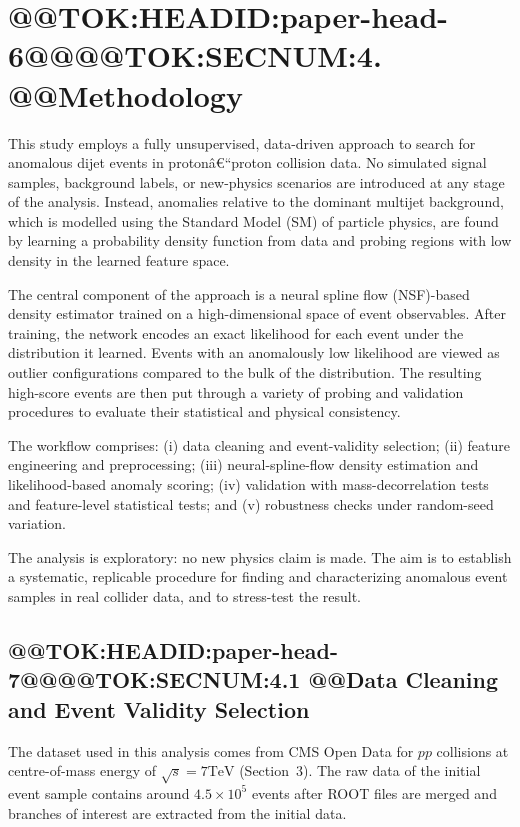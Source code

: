 \documentclass[11pt]{article}
\begin{document}
\section{@@TOK:HEADID:paper-head-6@@@@TOK:SECNUM:4. @@Methodology}

This study employs a fully unsupervised, data-driven approach to search for anomalous dijet events in protonâ€“proton collision data. No simulated signal samples, background labels, or new-physics scenarios are introduced at any stage of the analysis. Instead, anomalies relative to the dominant multijet background, which is modelled using the Standard Model (SM) of particle physics, are found by learning a probability density function from data and probing regions with low density in the learned feature space.

The central component of the approach is a neural spline flow (NSF)-based density estimator trained on a high-dimensional space of event observables. After training, the network encodes an exact likelihood for each event under the distribution it learned. Events with an anomalously low likelihood are viewed as outlier configurations compared to the bulk of the distribution. The resulting high-score events are then put through a variety of probing and validation procedures to evaluate their statistical and physical consistency.

The workflow comprises: (i) data cleaning and event-validity selection; (ii) feature engineering and preprocessing; (iii) neural-spline-flow density estimation and likelihood-based anomaly scoring; (iv) validation with mass-decorrelation tests and feature-level statistical tests; and (v) robustness checks under random-seed variation.

The analysis is exploratory: no new physics claim is made. The aim is to establish a systematic, replicable procedure for finding and characterizing anomalous event samples in real collider data, and to stress-test the result.

\subsection{@@TOK:HEADID:paper-head-7@@@@TOK:SECNUM:4.1 @@Data Cleaning and Event Validity Selection}

The dataset used in this analysis comes from CMS Open Data for $pp$ collisions at centre-of-mass energy of $\sqrt{s}=7\mathrm{TeV}$ (Section~3). The raw data of the initial event sample contains around $4.5\times 10^{5}$ events after ROOT files are merged and branches of interest are extracted from the initial data.
\end{document}
